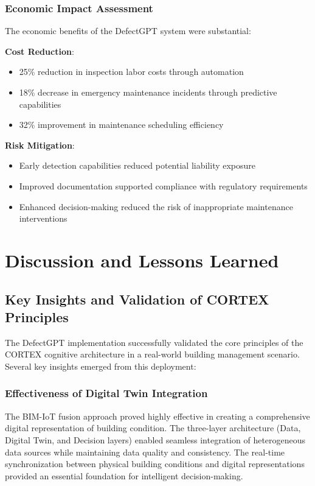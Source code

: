 {{\subsubsection{Economic Impact Assessment}

The economic benefits of the DefectGPT system were substantial:

\textbf{Cost Reduction}:
\begin{itemize}
    \item 25\% reduction in inspection labor costs through automation
    \item 18\% decrease in emergency maintenance incidents through predictive capabilities
    \item 32\% improvement in maintenance scheduling efficiency
\end{itemize}

\textbf{Risk Mitigation}:
\begin{itemize}
    \item Early detection capabilities reduced potential liability exposure
    \item Improved documentation supported compliance with regulatory requirements
    \item Enhanced decision-making reduced the risk of inappropriate maintenance interventions
\end{itemize}

\section{Discussion and Lessons Learned}

\subsection{Key Insights and Validation of CORTEX Principles}

The DefectGPT implementation successfully validated the core principles of the CORTEX cognitive architecture in a real-world building management scenario. Several key insights emerged from this deployment:

\subsubsection{Effectiveness of Digital Twin Integration}

The BIM-IoT fusion approach proved highly effective in creating a comprehensive digital representation of building condition. The three-layer architecture (Data, Digital Twin, and Decision layers) enabled seamless integration of heterogeneous data sources while maintaining data quality and consistency. The real-time synchronization between physical building conditions and digital representations provided an essential foundation for intelligent decision-making.

}}
